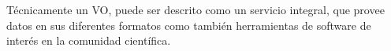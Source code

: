 Técnicamente un VO, puede ser descrito como un servicio integral, que provee datos en sus diferentes formatos como también herramientas de software de interés en la comunidad científica.

































